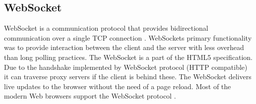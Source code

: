 \subsection{WebSocket}
\label{subsec:websocket}
WebSocket is a communication protocol that provides bidirectional communication over a single TCP connection \citep{rfc6455}. WebSockets primary functionality was to provide interaction between the client and the server with less overhead than long polling practices. The WebSocket is a part of the HTML5 specification. Due to the handshake implemented by WebSocket protocol (HTTP compatible) it can traverse proxy servers if the client is behind these. The WebSocket delivers live updates to the browser without the need of a page reload. Most of the modern Web browsers support the WebSocket protocol \citep{wssupport}.

